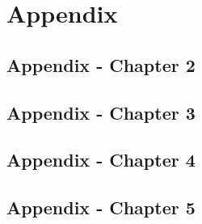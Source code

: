 \documentclass[a4paper,12pt,oneside]{memoir}
\begin{document}
\setcounter{chapter}{1}
\appendix
{}
\chapter{Appendix}

  \section{Appendix - Chapter 2}
  \setcounter{figure}{0} \renewcommand{\thefigure}{A.2.\arabic{figure}} 
  \setcounter{table}{0} \renewcommand{\thetable}{A.2.\arabic{table}}
  
  \clearpage
  
  \section{Appendix - Chapter 3}
  \setcounter{figure}{0} \renewcommand{\thefigure}{A.3.\arabic{figure}} 
  \setcounter{table}{0} \renewcommand{\thetable}{A.3.\arabic{table}}
  
  \clearpage

  \section{Appendix - Chapter 4}
  \setcounter{figure}{0} \renewcommand{\thefigure}{A.4.\arabic{figure}} 
  \setcounter{table}{0} \renewcommand{\thetable}{A.4.\arabic{table}}
  
  \clearpage
  
  \section{Appendix - Chapter 5}
  \setcounter{figure}{0} \renewcommand{\thefigure}{A.5.\arabic{figure}} 
  \setcounter{table}{0} \renewcommand{\thetable}{A.5.\arabic{table}}
  
  \clearpage

\end{document}
